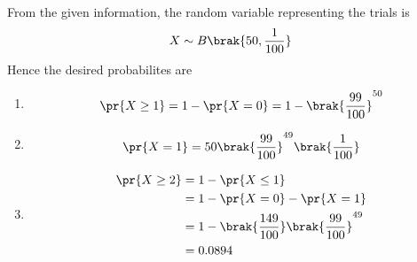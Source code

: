 From the given information, the random variable representing the trials is
\begin{align}
X \sim B\brak{50,\frac{1}{100}}
\end{align}
%
Hence the desired probabilites are
\begin{enumerate}
\item 
\begin{align}
\pr{X \ge 1} = 1 - \pr{X =0} = 1-\brak{\frac{99}{100}}^{50} 
\end{align}
%
\item 
\begin{align}
\pr{X = 1} = {50}\brak{\frac{99}{100}}^{49} \brak{\frac{1}{100}}
\end{align}
%
\item 
\begin{align}
\pr{X \ge 2} &= 1 - \pr{X \le 1} 
\\
&= 1 - \pr{X =0} - \pr{X = 1} \\
&= 1 -\brak{\frac{149}{100}}\brak{\frac{99}{100}}^{49}\\
&= 0.0894
\end{align}

\end{enumerate}

